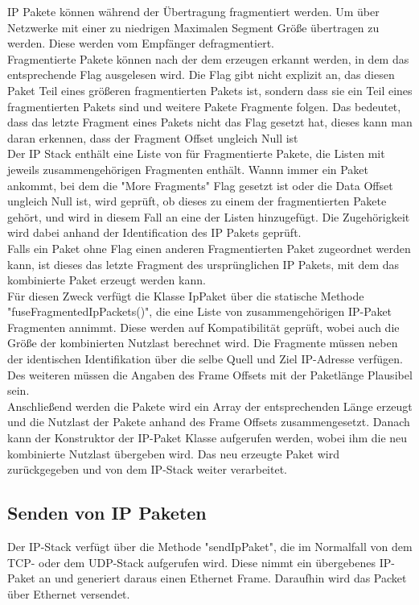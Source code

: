 IP Pakete können während der Übertragung fragmentiert werden. Um über Netzwerke mit einer zu niedrigen Maximalen Segment Größe übertragen zu werden. Diese werden vom Empfänger defragmentiert. \\
Fragmentierte Pakete können nach der dem erzeugen erkannt werden, in dem das entsprechende Flag ausgelesen wird. Die Flag gibt nicht explizit an, das diesen Paket Teil eines größeren fragmentierten Pakets ist, sondern dass sie ein Teil eines fragmentierten Pakets sind und weitere Pakete Fragmente folgen. Das bedeutet, dass das letzte Fragment eines Pakets nicht das Flag gesetzt hat, dieses kann man daran erkennen, dass der Fragment Offset ungleich Null ist\\
Der IP Stack enthält eine Liste von für Fragmentierte Pakete, die Listen mit jeweils zusammengehörigen Fragmenten enthält. Wannn immer ein Paket ankommt, bei dem die {}"More Fragments"{} Flag gesetzt ist oder die Data Offset ungleich Null ist, wird geprüft, ob dieses zu einem der fragmentierten Pakete gehört, und wird in diesem Fall an eine der Listen hinzugefügt. Die Zugehörigkeit wird dabei anhand der Identification des IP Pakets geprüft. \\
Falls ein Paket ohne Flag einen anderen Fragmentierten Paket zugeordnet werden kann, ist dieses das letzte Fragment des ursprünglichen IP Pakets, mit dem das kombinierte Paket erzeugt werden kann. \\
Für diesen Zweck verfügt die Klasse IpPaket über die statische Methode "{}fuseFragmentedIpPackets()"{}, die eine Liste von zusammengehörigen IP-Paket Fragmenten annimmt. Diese werden auf Kompatibilität geprüft, wobei auch die Größe der kombinierten Nutzlast berechnet wird. Die Fragmente müssen neben der identischen Identifikation über die selbe Quell und Ziel IP-Adresse verfügen. Des weiteren müssen die Angaben des Frame Offsets mit der Paketlänge Plausibel sein. \\
Anschließend werden die Pakete wird ein Array der entsprechenden Länge erzeugt und die Nutzlast der Pakete anhand des Frame Offsets zusammengesetzt. Danach kann der Konstruktor der IP-Paket Klasse aufgerufen werden, wobei ihm die neu kombinierte Nutzlast übergeben wird.  Das neu erzeugte Paket wird zurückgegeben und von dem IP-Stack weiter verarbeitet. 


\subsection{Senden von IP Paketen}
Der IP-Stack verfügt über die Methode "sendIpPaket", die im Normalfall von dem TCP- oder dem UDP-Stack aufgerufen wird. Diese nimmt ein übergebenes IP-Paket an und generiert daraus einen Ethernet Frame. Daraufhin wird das Packet über Ethernet versendet. 


